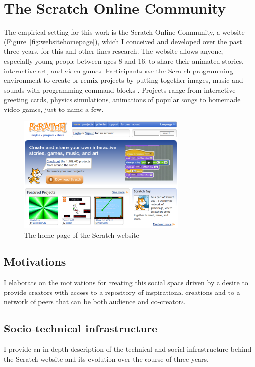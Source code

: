 \chapter{The Scratch Online Community}
The empirical setting for this work is the Scratch Online Community, a website (Figure~\ref{fig:websitehomepage}), which I conceived and developed over the past three years, for this and other lines research.
The website allows anyone, especially young people between ages 8 and 16, to share their animated stories, interactive art, and video games. Participants use the Scratch programming environment to create or remix projects by putting together images, music and sounds with programming command blocks \citep{resnick_scratch:_2009}.
Projects range from interactive greeting cards, physics simulations, animations of popular songs to homemade video games, just to name a few.  

\begin{figure}
\centering
\includegraphics[width=3.25in]{figures/websitehomepage.png}
\caption{The home page of the Scratch website}
\label{fig:homepage}
\end{figure}

\section{Motivations}

I elaborate on the motivations for creating this social space driven by a desire to provide creators with access to a repository of inspirational creations and to a network of peers that can be both audience and co-creators.


\section{Socio-technical infrastructure}
I provide an in-depth description of the technical and social infrastructure behind the Scratch website and its evolution over the course of three years.  

